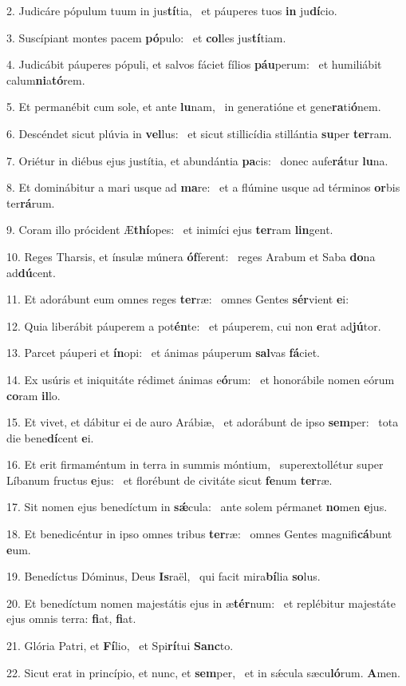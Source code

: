 2. Judicáre pópulum tuum in jus\textbf{tí}tia, \ast\  et páuperes tuos \textbf{in} ju\textbf{dí}cio.\

3. Suscípiant montes pacem \textbf{pó}pulo: \ast\  et \textbf{col}les jus\textbf{tí}tiam.\

4. Judicábit páuperes pópuli, et salvos fáciet fílios \textbf{páu}perum: \ast\  et humiliábit calum\textbf{ni}a\textbf{tó}rem.\

5. Et permanébit cum sole, et ante \textbf{lu}nam, \ast\  in generatióne et gene\textbf{ra}ti\textbf{ó}nem.\

6. Descéndet sicut plúvia in \textbf{vel}lus: \ast\  et sicut stillicídia stillántia \textbf{su}per \textbf{ter}ram.\

7. Oriétur in diébus ejus justítia, et abundántia \textbf{pa}cis: \ast\  donec aufe\textbf{rá}tur \textbf{lu}na.\

8. Et dominábitur a mari usque ad \textbf{ma}re: \ast\  et a flúmine usque ad términos \textbf{or}bis ter\textbf{rá}rum.\

9. Coram illo prócident Æ\textbf{thí}opes: \ast\  et inimíci ejus \textbf{ter}ram \textbf{lin}gent.\

10. Reges Tharsis, et ínsulæ múnera \textbf{óf}ferent: \ast\  reges Arabum et Saba \textbf{do}na ad\textbf{dú}cent.\

11. Et adorábunt eum omnes reges \textbf{ter}ræ: \ast\  omnes Gentes \textbf{sér}vient \textbf{e}i:\

12. Quia liberábit páuperem a pot\textbf{én}te: \ast\  et páuperem, cui non \textbf{e}rat ad\textbf{jú}tor.\

13. Parcet páuperi et \textbf{ín}opi: \ast\  et ánimas páuperum \textbf{sal}vas \textbf{fá}ciet.\

14. Ex usúris et iniquitáte rédimet ánimas e\textbf{ó}rum: \ast\  et honorábile nomen eórum \textbf{co}ram \textbf{il}lo.\

15. Et vivet, et dábitur ei de auro Arábiæ, \dag\  et adorábunt de ipso \textbf{sem}per: \ast\  tota die bene\textbf{dí}cent \textbf{e}i.\

16. Et erit firmaméntum in terra in summis móntium, \dag\  superextollétur super Líbanum fructus \textbf{e}jus: \ast\  et florébunt de civitáte sicut \textbf{fe}num \textbf{ter}ræ.\

17. Sit nomen ejus benedíctum in \textbf{sǽ}cula: \ast\  ante solem pérmanet \textbf{no}men \textbf{e}jus.\

18. Et benedicéntur in ipso omnes tribus \textbf{ter}ræ: \ast\  omnes Gentes magnifi\textbf{cá}bunt \textbf{e}um.\

19. Benedíctus Dóminus, Deus \textbf{Is}raël, \ast\  qui facit mira\textbf{bí}lia \textbf{so}lus.\

20. Et benedíctum nomen majestátis ejus in æ\textbf{tér}num: \ast\  et replébitur majestáte ejus omnis terra: \textbf{fi}at, \textbf{fi}at.\

21. Glória Patri, et \textbf{Fí}lio, \ast\  et Spi\textbf{rí}tui \textbf{Sanc}to.\

22. Sicut erat in princípio, et nunc, et \textbf{sem}per, \ast\  et in sǽcula sæcu\textbf{ló}rum. \textbf{A}men.\

